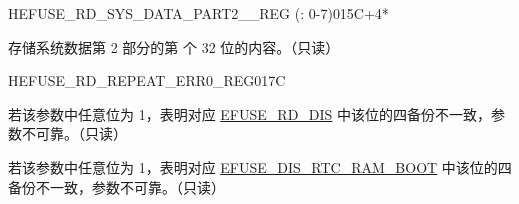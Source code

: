 \begin{register}{H}{EFUSE\_RD\_SYS\_DATA\_PART2\_\_REG (: 0-7)}{\hexprefix{}015C+4*}\label{regdesc:EFUSERDSYSDATAPART2NREG}
%
\regnewline%
\begin{regdesc}\begin{reglist}
\label{fielddesc:EFUSESYSDATAPART2N}\item [EFUSE\_SYS\_DATA\_PART2\_\regindex{n}] 存储系统数据第 2 部分的第  个 32 位的内容。（只读）
\end{reglist}\end{regdesc}
\end{register}


\begin{register}{H}{EFUSE\_RD\_REPEAT\_ERR0\_REG}{\hexprefix{}017C}\label{regdesc:EFUSERDREPEATERR0REG}
%
%
%
%
%
%
%
%
%
%
%
%
%
%
%
%
%
%
%
%
\regnewline%
\begin{regdesc}\begin{reglist}
\label{fielddesc:EFUSERDDISERR}\item [EFUSE\_RD\_DIS\_ERR] 若该参数中任意位为 1，表明对应 \hyperref[fielddesc:EFUSERDDIS]{EFUSE\_RD\_DIS} 中该位的四备份不一致，参数不可靠。（只读）
\label{fielddesc:EFUSEDISRTCRAMBOOTERR}\item [EFUSE\_DIS\_RTC\_RAM\_BOOT\_ERR] 若该参数中任意位为 1，表明对应 \hyperref[fielddesc:EFUSEDISRTCRAMBOOT]{EFUSE\_DIS\_RTC\_RAM\_BOOT} 中该位的四备份不一致，参数不可靠。（只读）

\end{reglist}
\end{regdesc}
\end{register}

